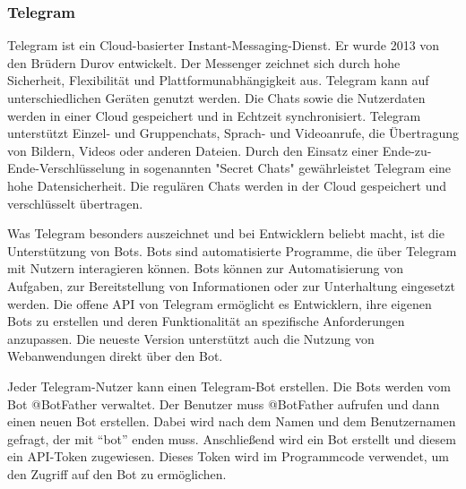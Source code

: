 \documentclass[12pt, letterpaper]{article}
\begin{document}
\subsubsection{Telegram}
\par Telegram ist ein Cloud-basierter Instant-Messaging-Dienst. Er wurde 2013 von den Brüdern Durov entwickelt. Der Messenger zeichnet sich durch hohe Sicherheit, Flexibilität und Plattformunabhängigkeit aus. Telegram kann auf unterschiedlichen Geräten genutzt werden. Die Chats sowie die Nutzerdaten werden in einer Cloud gespeichert und in Echtzeit synchronisiert. Telegram unterstützt Einzel- und Gruppenchats, Sprach- und Videoanrufe, die Übertragung von Bildern, Videos oder anderen Dateien. Durch den Einsatz einer Ende-zu-Ende-Verschlüsselung in sogenannten "Secret Chats" gewährleistet Telegram eine hohe Datensicherheit. Die regulären Chats werden in der Cloud gespeichert und verschlüsselt übertragen.
\par Was Telegram besonders auszeichnet und bei Entwicklern beliebt macht, ist die Unterstützung von Bots. Bots sind automatisierte Programme, die über Telegram mit Nutzern interagieren können. Bots können zur Automatisierung von Aufgaben, zur Bereitstellung von Informationen oder zur Unterhaltung eingesetzt werden. Die offene API von Telegram ermöglicht es Entwicklern, ihre eigenen Bots zu erstellen und deren Funktionalität an spezifische Anforderungen anzupassen. Die neueste Version unterstützt auch die Nutzung von Webanwendungen direkt über den Bot.
\par Jeder Telegram-Nutzer kann einen Telegram-Bot erstellen. Die Bots werden vom Bot @BotFather verwaltet. Der Benutzer muss @BotFather aufrufen und dann einen neuen Bot erstellen. Dabei wird nach dem Namen und dem Benutzernamen gefragt, der mit “bot” enden muss. Anschließend wird ein Bot erstellt und diesem ein API-Token zugewiesen. Dieses Token wird im Programmcode verwendet, um den Zugriff auf den Bot zu ermöglichen.
\end{document}
